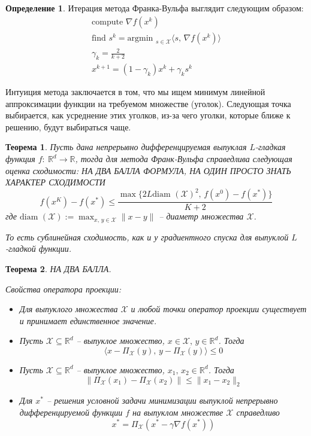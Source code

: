 \documentclass[a4paper,12pt]{article}
\renewcommand{\leq}{\ensuremath{\leqslant}}
\theoremstyle{plain}
\newtheorem{theorem}{Теорема}[section]
\theoremstyle{definition}
\newtheorem{definition}{Определение}[section]
\theoremstyle{remark}
\begin{document}
\begin{definition}
	Итерация метода Франка-Вульфа выглядит следующим образом:
	\begin{align*}
		\text{compute }\nabla f(x^k)                                                          \\
		\text{find }s^k = \text{argmin }_{s \in \mathcal{X}}\langle s,\, \nabla f(x^k)\rangle \\
		\gamma_k = \frac{2}{k + 2}                                                            \\
		x^{k + 1} = (1 - \gamma_k)x^k + \gamma_ks^k
	\end{align*}
\end{definition}
Интуиция метода заключается в том, что мы ищем минимум линейной аппроксимации функции на требуемом множестве (уголок). Следующая точка выбирается, как усреднение этих уголков, из-за чего уголки, которые ближе к решению, будут выбираться чаще.

\begin{theorem}
	Пусть дана непрерывно дифференцируемая выпуклая $L$-гладкая функция $f :\: \mathbb{R}^d \to \mathbb{R}$, тогда для метода Франк-Вульфа справедлива следующая оценка сходимости: НА ДВА БАЛЛА ФОРМУЛА, НА ОДИН ПРОСТО ЗНАТЬ ХАРАКТЕР СХОДИМОСТИ
	\[
		f(x^K) - f(x^*) \leq \frac{\max\{2L\text{diam }(\mathcal{X})^2,\, f(x^0) - f(x^*)\}}{K + 2}
	\]
	где $\text{diam }(\mathcal{X}) := \max_{x,\, y \in \mathcal{X}} \|x - y\|$ -- диаметр множества $\mathcal{X}$.

	То есть сублинейная сходимость, как и у градиентного спуска для выпуклой $L$-гладкой функции.
\end{theorem}

\begin{theorem}
	НА ДВА БАЛЛА.

	Свойства оператора проекции:
	\begin{itemize}
		\item Для выпуклого множества $\mathcal{X}$ и любой точки оператор проекции существует и принимает единственное значение.
		\item Пусть $\mathcal{X} \subseteq \mathbb{R}^d$ -- выпуклое множество, $x \in \mathcal{X},\, y \in \mathbb{R}^d$. Тогда
		      \[
			      \langle x - \Pi_\mathcal{X}(y),\, y - \Pi_\mathcal{X}(y)\rangle \leq 0
		      \]
		\item Пусть $\mathcal{X} \subseteq \mathbb{R}^d$ -- выпуклое множество, $x_1,\,x_2 \in \mathbb{R}^d$. Тогда
		      \[
			      \|\Pi_\mathcal{X}(x_1) - \Pi_\mathcal{X}(x_2)\| \leq \|x_1 - x_2\|_2
		      \]
		\item Для $x^*$ -- решения условной задачи минимизации выпуклой непрерывно дифференцируемой функции $f$ на выпуклом множестве $\mathcal{X}$ справедливо
		      \[
			      x^* = \Pi_\mathcal{X}(x^* - \gamma\nabla f(x^*))
		      \]
	\end{itemize}
\end{theorem}
\end{document}

